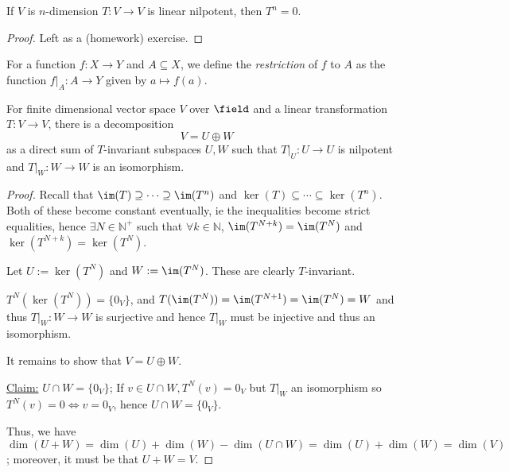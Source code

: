 \begin{proposition}
    If $V$ is $n$-dimension $T :V \to V$ is linear nilpotent, then $T^n = 0$.
\end{proposition}
\begin{proof}
    Left as a (homework) exercise.
\end{proof}

\begin{definition}
    For a function $f: X \to Y$ and $A \subseteq X$, we define the \emph{restriction} of $f$ to $A$ as the function $f\vert_A : A \to Y$ given by $a \mapsto f(a)$.
\end{definition}

\begin{theorem}\label{thm:fittingstheorem}
    For finite dimensional vector space $V$ over $\field$ and a linear transformation $T: V \to V$, there is a decomposition \[
    V = U \oplus W    
    \]
    as a direct sum of $T$-invariant subspaces $U, W$ such that $T\vert_U : U \to U$ is nilpotent and $T\vert_W : W \to W$ is an isomorphism.
\end{theorem}

\begin{proof}
    Recall that $\im(T) \supseteq \cdots \supseteq \im(T^n)$ and $\ker(T) \subseteq \cdots \subseteq \ker(T^n)$. Both of these become constant eventually, ie the inequalities become strict equalities, hence $\exists N \in \mathbb{N}^+$ such that $\forall k \in \mathbb{N}$, $\im(T^{N+k}) = \im(T^N)$ and $\ker(T^{N+k}) = \ker(T^{N})$.

    Let $U := \ker(T^N)$ and $W := \im(T^N)$. These are clearly $T$-invariant. 

    $T^N(\ker(T^N)) = \{0_V\}$, and $T(\im(T^N)) = \im(T^{N+1}) =\im(T^N) = W$ and thus $T\vert_W : W \to W$ is surjective and hence $T\vert_W$ must be injective and thus an isomorphism.

    It remains to show that $V = U \oplus W$.

    \underline{Claim:} $U \cap W = \{0_V\}$; If $v \in U \cap W, T^N(v) = 0_V$ but $T\vert_W$ an isomorphism so $T^N(v) = 0 \iff v = 0_V$, hence $U \cap W = \{0_V\}$.

    Thus, we have $\dim(U + W) = \dim(U) + \dim(W) - \dim(U \cap W) = \dim(U) + \dim(W) = \dim(V)$; moreover, it must be that $U + W = V$.
\end{proof}